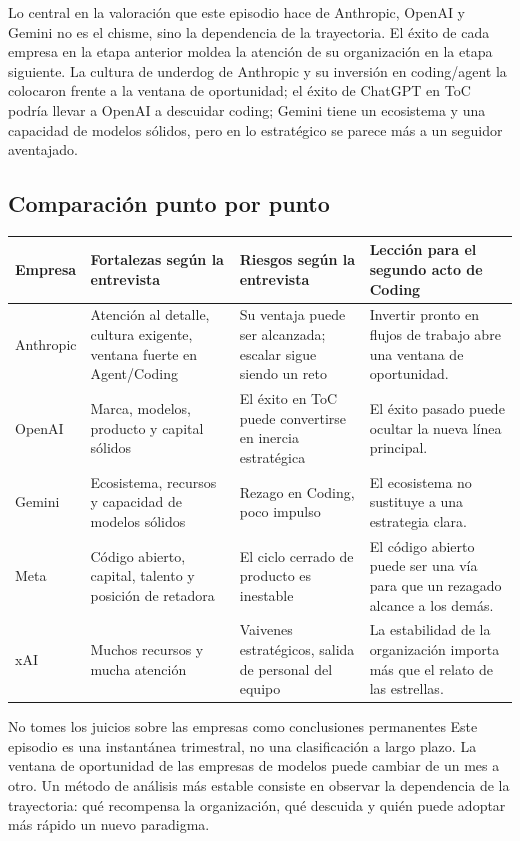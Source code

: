 \documentclass[a4paper]{article}
\begin{document}
Lo central en la valoración que este episodio hace de Anthropic, OpenAI y Gemini no es el chisme, sino la dependencia de la trayectoria. El éxito de cada empresa en la etapa anterior moldea la atención de su organización en la etapa siguiente. La cultura de underdog de Anthropic y su inversión en coding/agent la colocaron frente a la ventana de oportunidad; el éxito de ChatGPT en ToC podría llevar a OpenAI a descuidar coding; Gemini tiene un ecosistema y una capacidad de modelos sólidos, pero en lo estratégico se parece más a un seguidor aventajado.

\subsection{Comparación punto por punto}

\noindent\begin{longtable}{p{}p{}p{}p{}}
\toprule
Empresa & Fortalezas según la entrevista & Riesgos según la entrevista & Lección para el segundo acto de Coding \\
\midrule
Anthropic & Atención al detalle, cultura exigente, ventana fuerte en Agent/Coding & Su ventaja puede ser alcanzada; escalar sigue siendo un reto & Invertir pronto en flujos de trabajo abre una ventana de oportunidad. \\
OpenAI & Marca, modelos, producto y capital sólidos & El éxito en ToC puede convertirse en inercia estratégica & El éxito pasado puede ocultar la nueva línea principal. \\
Gemini & Ecosistema, recursos y capacidad de modelos sólidos & Rezago en Coding, poco impulso & El ecosistema no sustituye a una estrategia clara. \\
Meta & Código abierto, capital, talento y posición de retadora & El ciclo cerrado de producto es inestable & El código abierto puede ser una vía para que un rezagado alcance a los demás. \\
xAI & Muchos recursos y mucha atención & Vaivenes estratégicos, salida de personal del equipo & La estabilidad de la organización importa más que el relato de las estrellas. \\
\bottomrule
\end{longtable}

\begin{warningbox}{No tomes los juicios sobre las empresas como conclusiones permanentes}
Este episodio es una instantánea trimestral, no una clasificación a largo plazo. La ventana de oportunidad de las empresas de modelos puede cambiar de un mes a otro. Un método de análisis más estable consiste en observar la dependencia de la trayectoria: qué recompensa la organización, qué descuida y quién puede adoptar más rápido un nuevo paradigma.
\end{warningbox}
\end{document}
